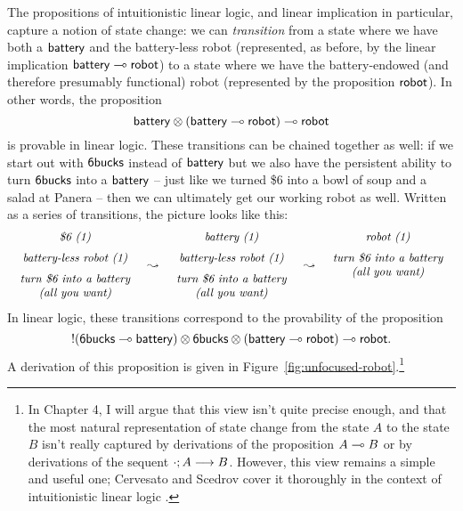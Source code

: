 The propositions of intuitionistic linear logic, and linear implication
in particular, capture a notion of state change: we can {\it
  transition} from a state where we have both a ${\sf battery}$ and
the battery-less robot (represented, as before, by the linear
implication ${\sf battery} \multimap {\sf robot}$) to a state where we
have the battery-endowed (and therefore presumably functional) robot
(represented by the proposition ${\sf robot}$). In other words, the
proposition
%
\[{\sf battery} \otimes ({\sf battery} \multimap {\sf robot}) \multimap
{\sf robot}\] 
%
is provable in linear logic. These transitions can be chained
together as well: if we start out with ${\sf
  6bucks}$ instead of ${\sf battery}$ but we also have the
persistent ability to turn ${\sf 6bucks}$ into a ${\sf battery}$ --
just like we turned \$6 into a bowl of soup and a salad at Panera --
then we can ultimately get our working robot as well.
Written as a series of transitions, the picture looks like this:
\[
\begin{array}{ccccc}
\begin{array}{c}
\mbox{\it \$6 (1)}\medskip\\ 
\mbox{\it battery-less robot (1)} \medskip\\ 
\mbox{\it turn \$6 into a battery}\\
\mbox{\it (all you want)}
\end{array}
& \leadsto &
\begin{array}{c}
\mbox{\it battery  (1)}\medskip\\ 
\mbox{\it battery-less robot (1)} \medskip\\ 
\mbox{\it turn \$6 into a battery}\\
\mbox{\it (all you want)}
\end{array}
& \leadsto &
\begin{array}{c}
\mbox{\it robot (1)} \medskip\\ 
\mbox{\it turn \$6 into a battery}\\
\mbox{\it (all you want)}\medskip\\~\\
\end{array}
\end{array}
\]
In linear logic, these transitions correspond to the provability
of the proposition
\[{!}({\sf 6bucks} \multimap {\sf battery}) \otimes {\sf 6bucks} \otimes
({\sf battery} \multimap {\sf robot}) \multimap {\sf robot}.\] 
A derivation of this proposition is given in
Figure~\ref{fig:unfocused-robot}.\footnote{In Chapter 4, I will
  argue that this view isn't quite precise enough, and that the most
  natural representation of state change from the state $A$ to the
  state $B$ isn't really captured by derivations of the proposition $A
  \multimap B$ or by derivations of the sequent
  ${\cdot};{A} \longrightarrow {B} \mathstrut$.  However, this view remains a simple and useful
  one; Cervesato and Scedrov cover it thoroughly in the context of
  intuitionistic linear logic \cite{cervesato09relating}.}  

